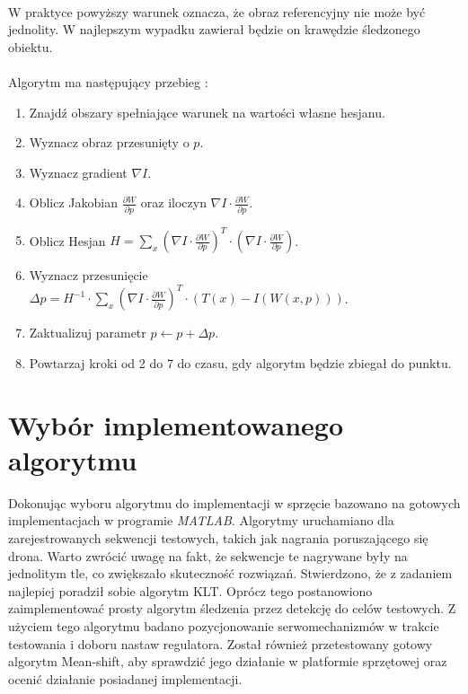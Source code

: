 \paragraph*{}
W praktyce powyższy warunek oznacza, że obraz referencyjny nie może być jednolity. W najlepszym wypadku zawierał będzie on krawędzie śledzonego obiektu.
\paragraph*{}
Algorytm ma następujący przebieg \cite{KK}:
\begin{enumerate}
\item Znajdź obszary spełniające warunek na wartości własne hesjanu.
\item Wyznacz obraz przesunięty o \(p\).
\item Wyznacz gradient \(\nabla I\).
\item Oblicz Jakobian \(\frac{\partial W}{\partial p}\) oraz iloczyn \(\nabla I \cdot \frac{\partial W}{\partial p}\).
\item Oblicz Hesjan \(H=\sum\limits_x (\nabla I \cdot \frac{\partial W}{\partial p})^T \cdot (\nabla I \cdot \frac{\partial W}{\partial p})\).
\item Wyznacz przesunięcie \(\Delta p=H^{-1} \cdot \sum\limits_x (\nabla I \cdot \frac{\partial W}{\partial p})^T \cdot (T(x)-I(W(x,p)))\).
\item Zaktualizuj parametr \(p \leftarrow p+\Delta p\).
\item Powtarzaj kroki od 2 do 7 do czasu, gdy algorytm będzie zbiegał do punktu.
\end{enumerate}

\section{Wybór implementowanego algorytmu}
\label{sec:wyborimplementowanegoalgorytmu}

Dokonując wyboru algorytmu do implementacji w sprzęcie bazowano na gotowych implementacjach w programie \textit{MATLAB}. Algorytmy uruchamiano dla zarejestrowanych sekwencji testowych, takich jak nagrania poruszającego się drona. Warto zwrócić uwagę na fakt, że sekwencje te nagrywane były na jednolitym tle, co zwiększało skuteczność rozwiązań. Stwierdzono, że z zadaniem najlepiej poradził sobie algorytm KLT. Oprócz tego postanowiono zaimplementować prosty algorytm śledzenia przez detekcję do celów testowych.  Z użyciem tego algorytmu badano pozycjonowanie serwomechanizmów w trakcie testowania i doboru nastaw regulatora. Został również przetestowany gotowy algorytm Mean-shift, aby sprawdzić jego działanie w platformie sprzętowej oraz ocenić działanie posiadanej implementacji.